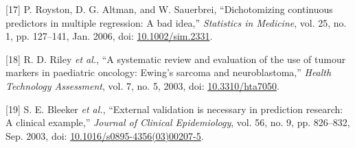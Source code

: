 \documentclass[
]{article}
\newenvironment{cslreferences}%
  {}%
  {\par}
\begin{document}
\begin{cslreferences}
\leavevmode\hypertarget{ref-royston_dichotomizing_2006}{}%
{[}17{]} P. Royston, D. G. Altman, and W. Sauerbrei, ``Dichotomizing continuous predictors in multiple regression: A bad idea,'' \emph{Statistics in Medicine}, vol. 25, no. 1, pp. 127--141, Jan. 2006, doi: \href{https://doi.org/10.1002/sim.2331}{10.1002/sim.2331}.

\leavevmode\hypertarget{ref-riley_systematic_2003-1}{}%
{[}18{]} R. D. Riley \emph{et al.}, ``A systematic review and evaluation of the use of tumour markers in paediatric oncology: Ewing's sarcoma and neuroblastoma,'' \emph{Health Technology Assessment}, vol. 7, no. 5, 2003, doi: \href{https://doi.org/10.3310/hta7050}{10.3310/hta7050}.

\leavevmode\hypertarget{ref-bleeker_external_2003}{}%
{[}19{]} S. E. Bleeker \emph{et al.}, ``External validation is necessary in prediction research: A clinical example,'' \emph{Journal of Clinical Epidemiology}, vol. 56, no. 9, pp. 826--832, Sep. 2003, doi: \href{https://doi.org/10.1016/s0895-4356(03)00207-5}{10.1016/s0895-4356(03)00207-5}.
\end{cslreferences}
\end{document}
